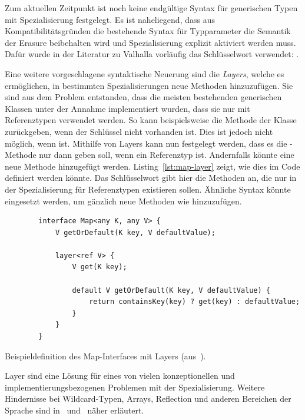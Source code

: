 Zum aktuellen Zeitpunkt ist noch keine endgültige Syntax für generischen Typen mit Spezialisierung festgelegt.
Es ist naheliegend, dass aus Kompatibilitätsgründen die bestehende Syntax für Typparameter die Semantik der Erasure beibehalten wird und Spezialisierung explizit aktiviert werden muss.
Dafür wurde in der Literatur zu Valhalla vorläufig das Schlüsselwort  verwendet: .

Eine weitere vorgeschlagene syntaktische Neuerung sind die \emph{Layers}, welche es ermöglichen, in bestimmten Spezialisierungen neue Methoden hinzuzufügen.
Sie sind aus dem Problem entstanden, dass die meisten bestehenden generischen Klassen unter der Annahme implementiert wurden, dass sie nur mit Referenztypen verwendet werden.
So kann beispielsweise die Methode  der Klasse   zurückgeben, wenn der Schlüssel nicht vorhanden ist.
Dies ist jedoch nicht möglich, wenn  ist.
Mithilfe von Layers kann nun festgelegt werden, dass es die -Methode nur dann geben soll, wenn  ein Referenztyp ist.
Andernfalls könnte eine neue Methode  hinzugefügt werden.
Listing~\ref{lst:map-layer} zeigt, wie dies im Code definiert werden könnte.
Das Schlüsselwort  gibt hier die Methoden an, die nur in der Spezialisierung für Referenztypen  existieren sollen.
Ähnliche Syntax könnte eingesetzt werden, um gänzlich neue Methoden wie  hinzuzufügen.

\begin{listing}
    \begin{verbatim}
        interface Map<any K, any V> {
            V getOrDefault(K key, V defaultValue);

            layer<ref V> {
                V get(K key);

                default V getOrDefault(K key, V defaultValue) {
                    return containsKey(key) ? get(key) : defaultValue;
                }
            }
        }
    \end{verbatim}
    \vspace{-3ex}
    \caption{Beispieldefinition des Map-Interfaces mit Layers (aus~\cite{specialization}).}
    \label{lst:map-layer}
\end{listing}

Layer sind eine Lösung für eines von vielen konzeptionellen und implementierungsbezogenen Problemen mit der Spezialisierung.
Weitere Hindernisse bei Wildcard-Typen, Arrays, Reflection und anderen Bereichen der Sprache sind in~\cite{jep-218} und~\cite{specialization} näher erläutert.
